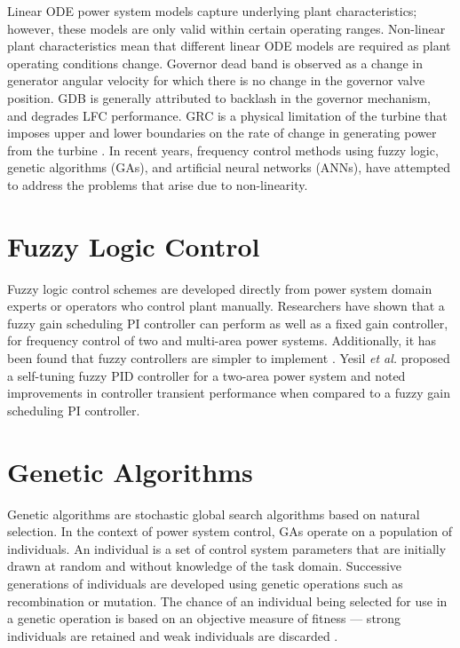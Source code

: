 Linear ODE power system models capture underlying plant characteristics; however, these models are only valid within certain operating ranges. Non-linear plant characteristics mean that different linear ODE models are required as plant operating conditions change. Governor dead band is observed as a change in generator angular velocity for which there is no change in the governor valve position. GDB is generally attributed to backlash in the governor mechanism, and degrades LFC performance. GRC is a physical limitation of the turbine that imposes upper and lower boundaries on the rate of change in generating power from the turbine \cite{Morsali2014}. In recent years, frequency control methods using fuzzy logic, genetic algorithms (GAs), and artificial neural networks (ANNs), have attempted to address the problems that arise due to non-linearity.

\section{Fuzzy Logic Control}
Fuzzy logic control schemes are developed directly from power system domain experts or operators who control plant manually. Researchers have shown that a fuzzy gain scheduling PI controller can perform as well as a fixed gain controller, for frequency control of two and multi-area power systems. Additionally, it has been found that fuzzy controllers are simpler to implement \cite{Chang1997, Cam2005}. Yesil \textit{et al.} \cite{Yesil2004} proposed a self-tuning fuzzy PID controller for a two-area power system and noted improvements in controller transient performance when compared to a fuzzy gain scheduling PI controller.

\section{Genetic Algorithms}
Genetic algorithms are stochastic global search algorithms based on natural selection. In the context of power system control, GAs operate on a population of individuals. An individual is a set of control system parameters that are initially drawn at random and without knowledge of the task domain. Successive generations of individuals are developed using genetic operations such as recombination or mutation. The chance of an individual being selected for use in a genetic operation is based on an objective measure of fitness --- strong individuals are retained and weak individuals are discarded \cite{Fleming1993}.

